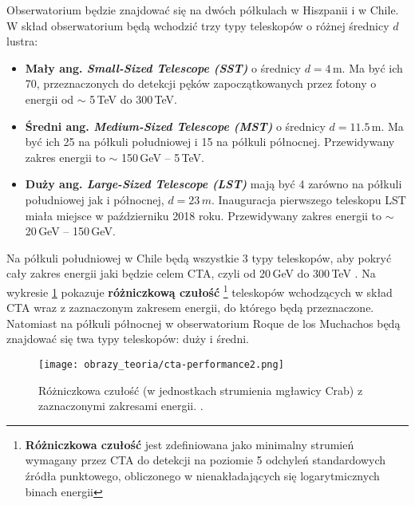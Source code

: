 \documentclass[a4paper,11pt,twoside]{article}
\begin{document}
Obserwatorium będzie znajdować się na dwóch półkulach w Hiszpanii i w Chile. W skład obserwatorium będą wchodzić trzy typy teleskopów o różnej średnicy $d$ lustra:
\begin{itemize}
\item {\bf{Mały} ang. \textsl{Small-Sized Telescope (SST)}} o średnicy $d = 4$\,m. Ma być ich 70, przeznaczonych do detekcji pęków zapoczątkowanych przez fotony o energii od $\sim$ 5\,TeV do 300\,TeV.
\item {\bf{Średni} ang. \textsl{Medium-Sized Telescope (MST)}} o średnicy $d = 11.5$\,m. Ma być ich 25 na półkuli południowej i 15 na półkuli północnej. Przewidywany zakres energii to $\sim$ 150\,GeV -- 5\,TeV.
\item {\bf{Duży} ang. \textsl{Large-Sized Telescope (LST)}} mają być 4 zarówno na półkuli południowej jak i północnej, $d = 23\,m$. Inauguracja pierwszego teleskopu LST miała miejsce w październiku 2018 roku. Przewidywany zakres energii to $\sim$ 20\,GeV -- 150\,GeV.
\end{itemize}
Na półkuli południowej w Chile będą wszystkie 3 typy teleskopów,
 aby pokryć cały zakres energii jaki będzie celem CTA, czyli od 20\,GeV do 300\,TeV \cite{cta-perform}.
Na wykresie \ref{fig:cta_perform} pokazuje {\bf{różniczkową czułość}} \footnote{ {\bf{Różniczkowa czułość}} jest zdefiniowana jako minimalny strumień wymagany przez CTA do detekcji na poziomie 5 odchyleń standardowych źródła punktowego, obliczonego w nienakładających się logarytmicznych binach energii} teleskopów wchodzących w skład CTA wraz z zaznaczonym zakresem energii, do którego będą przeznaczone. 
Natomiast na półkuli północnej w obserwatorium Roque de los Muchachos będą znajdować się twa typy teleskopów: duży i średni.
\begin{figure}[H] 
\centering
\texttt{[image: obrazy\_teoria/cta-performance2.png]}
\caption{Różniczkowa czułość (w jednostkach strumienia mgławicy Crab) z zaznaczonymi zakresami energii. \cite{cta-concept}.}
\label{fig:cta_perform}
\end{figure}
\end{document}
